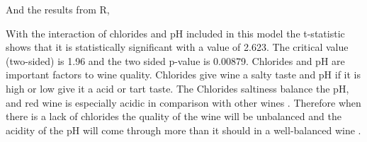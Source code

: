 \documentclass[]{article}
\begin{document}
And the results from R, 
\begin{table}[H]
	\centering
\end{table}

With the interaction of chlorides and pH included in this model the t-statistic shows that it is statistically significant with a value of 2.623. The critical value (two-sided) is 1.96 and the two sided p-value is 0.00879. Chlorides and pH are important factors to wine quality. Chlorides give wine a salty taste \cite{winSite} and pH if it is high or low give it a acid or tart taste. The Chlorides saltiness balance the pH, and red wine is especially acidic in comparison with other wines \cite{wineMag}. Therefore when there is a lack of chlorides the quality of the wine will be unbalanced and the acidity of the pH will come through more than it should in a well-balanced wine \cite{wineGeek}.  
\end{document}
